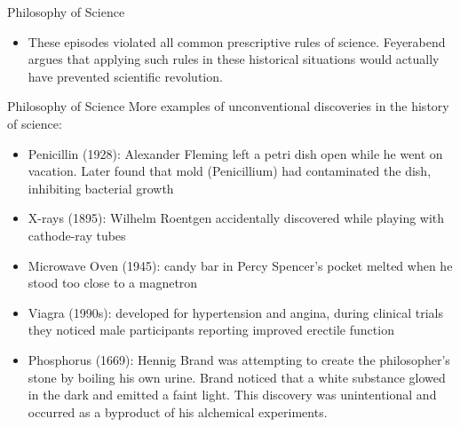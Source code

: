 \documentclass{beamer}
\begin{document}
\begin{frame}{Philosophy of Science}
\begin{itemize}
\begin{itemize}
				\item<4-> Galileo's hypothesis that the earth rotates on its axis employed a combination of empirical observations, rhetorical strategies, and even thought experiments to make his case
			\end{itemize}
			\item<5-> These episodes violated all common prescriptive rules of science. Feyerabend argues that applying such rules in these historical situations would actually have prevented scientific revolution.
		\end{itemize}
	
\end{frame}

\begin{frame}{Philosophy of Science}
	More examples of unconventional discoveries in the history of science:
	\begin{itemize}
		\item<2-> Penicillin (1928): Alexander Fleming left a petri dish open while he went on vacation. Later found that mold (Penicillium) had contaminated the dish, inhibiting bacterial growth
		\item<3-> X-rays (1895): Wilhelm Roentgen accidentally discovered while playing with cathode-ray tubes
		\item<4-> Microwave Oven (1945): candy bar in Percy Spencer's pocket melted when he stood too close to a magnetron
		\item<5-> Viagra (1990s): developed for hypertension and angina, during clinical trials they noticed male participants reporting improved erectile function
		\item<6-> Phosphorus (1669): Hennig Brand was attempting to create the philosopher's stone by boiling his own urine. Brand noticed that a white substance glowed in the dark and emitted a faint light. This discovery was unintentional and occurred as a byproduct of his alchemical experiments.
	\end{itemize}
\end{frame}

\end{document}
